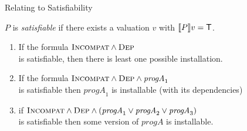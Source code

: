 \documentclass[xetex,aspectratio=169,14pt,hyperref={pdfpagelabels=true,pdflang={en-GB}}]{beamer}
\begin{document}
\begin{frame}
  {Relating to Satisfiability}

  \textcolor{black!60}{$P$ is \emph{satisfiable} if there exists a
  valuation $v$ with $\llbracket P \rrbracket v = \mathsf{T}$.}

  \pause
  \bigskip

  \begin{enumerate}
  \item If the formula \qquad $\textsc{Incompat} \land \textsc{Dep}$ \\
    is satisfiable, then there is least one possible
    installation.\\
  \item If the formula \qquad $\textsc{Incompat} \land \textsc{Dep} \land \mathit{progA}_1$ \\
    is satisfiable then $\mathit{progA}_1$ is installable (with its dependencies)
  \item if \qquad $\textsc{Incompat} \land \textsc{Dep} \land (\mathit{progA}_1 \lor \mathit{progA}_2 \lor \mathit{progA}_3)$ \\
    is satisfiable then some version of $\mathit{progA}$ is installable.
  \end{enumerate}


\end{frame}
\end{document}

